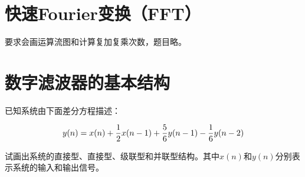 \documentclass[cn, hazy, blue, normal, 14pt]{elegantnote}
\begin{document}
\section{快速Fourier变换（FFT）}

要求会画运算流图和计算复加复乘次数，题目略。

\section{数字滤波器的基本结构}

\begin{exercise}

已知系统由下面差分方程描述：

\begin{equation}
\notag
    y(n)=x(n)+\frac{1}{2}x(n-1)+\frac{5}{6}y(n-1)-\frac{1}{6}y(n-2)
\end{equation}

试画出系统的直接\uppercase\expandafter{}型、直接\uppercase\expandafter{}型、级联型和并联型结构。其中$x(n)$和$y(n)$分别表示系统的输入和输出信号。

\end{exercise}
\end{document}
